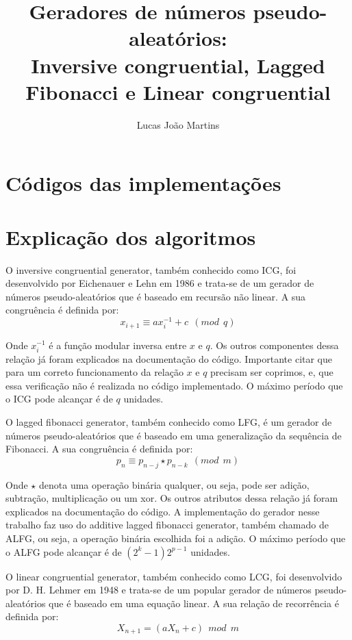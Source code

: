 \documentclass[12pt]{article}
\title{
  Geradores de números pseudo-aleatórios: \\
  \large Inversive congruential, Lagged Fibonacci e Linear congruential}
\author{Lucas João Martins}
\date{}
\begin{document}
\maketitle

\section{Códigos das implementações}




\section{Explicação dos algoritmos}
O inversive congruential generator, também conhecido como ICG, foi desenvolvido
por Eichenauer e Lehn em 1986 e trata-se de um gerador de números
pseudo-aleatórios que é baseado em recursão não linear. A sua congruência é
definida por:
\begin{equation}
  x_{i+1} \equiv ax_i^{-1} + c \ \ (mod \ \ q)
\end{equation}

Onde $x_i^{-1}$ é a função modular inversa entre $x$ e $q$. Os outros
componentes dessa relação já foram explicados na documentação do código.
Importante citar que para um correto funcionamento da relação $x$ e $q$ precisam
ser coprimos, e, que essa verificação não é realizada no código implementado. O
máximo período que o ICG pode alcançar é de $q$ unidades.

O lagged fibonacci generator, também conhecido como LFG, é um gerador de números
pseudo-aleatórios que é baseado em uma generalização da sequência de Fibonacci.
A sua congruência é definida por:
\begin{equation}
  p_{n} \equiv p_{n-j} \star p_{n-k} \ \ (mod \ \ m)
\end{equation}

Onde $\star$ denota uma operação binária qualquer, ou seja, pode ser adição,
subtração, multiplicação ou um xor. Os outros atributos dessa relação já foram
explicados na documentação do código. A implementação do gerador nesse trabalho
faz uso do additive lagged fibonacci generator, também chamado de ALFG, ou seja,
a operação binária escolhida foi a adição. O máximo período que o ALFG pode
alcançar é de $(2^k - 1)2^{p-1}$ unidades.

O linear congruential generator, também conhecido como LCG, foi desenvolvido por
D. H. Lehmer em 1948 e trata-se de um popular gerador de números
pseudo-aleatórios que é baseado em uma equação linear. A sua relação de
recorrência é definida por:
\begin{equation}
  X_{n+1} = (aX_n + c) \ \ mod \ \ m
\end{equation}
\end{document}
